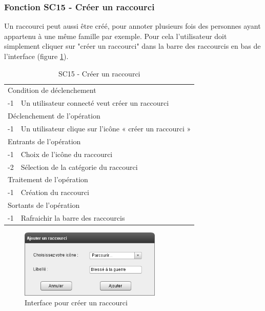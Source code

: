 \documentclass[a4paper]{article}
\begin{document}
\subsubsection{Fonction SC15 - Créer un raccourci}
Un raccourci peut aussi être créé, pour annoter plusieurs fois des personnes ayant appartenu à une même famille par exemple. Pour cela l'utilisateur doit simplement cliquer sur "créer un raccourci" dans la barre des raccourcis en bas de l’interface (figure \ref{fig:interface_ajout_raccourci}).\\
\begin{table}[H]
  \centering
   \small
	\begin{tabular}{|c|p{12cm}|}
   		\hline
   			\rowcolor{lightgray}\multicolumn{2}{|c|}{\textbf{SC15 - Créer un raccourci}} \\
   		\hline
   			\multicolumn{2}{|l|}{Condition de d\'eclenchement} \\
   		\hline
   			-1 & Un utilisateur connecté veut créer un raccourci\\
   		\hline
   			\multicolumn{2}{|l|}{D\'eclenchement de l'op\'eration} \\
   		\hline
   			-1 & Un utilisateur clique sur l'icône « créer un raccourci »\\
   		\hline
   			\multicolumn{2}{|l|}{Entrants de l'op\'eration} \\
   		\hline
   			-1 & Choix de l'icône du raccourci\\
			-2 & Sélection de la catégorie du raccourci\\
   		\hline
   			\multicolumn{2}{|l|}{Traitement de l'op\'eration} \\
  		\hline
   			-1 & Création du raccourci\\
   		\hline
   			\multicolumn{2}{|l|}{Sortants de l'op\'eration} \\
   		\hline
   			-1 & Rafraichir la barre des raccourcis\\
   		\hline
	\end{tabular}
  \caption{SC15 - Créer un raccourci}
  \normalsize
  \label{tab:creer_raccourci}
\end{table}

\begin{figure}[H]
\centering
\includegraphics[width=0.6\textwidth]{ajouterraccourci.png}
\caption{Interface pour créer un raccourci}
\label{fig:interface_ajout_raccourci}
\end{figure}
\end{document}

